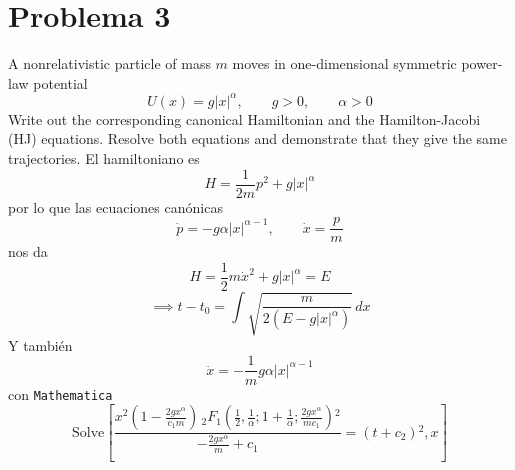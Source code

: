 \documentclass[]{article}
\numberwithin{equation}{section}
\begin{document}
\section{Problema 3}
A nonrelativistic particle of mass $m$ moves in one-dimensional symmetric power-law potential
\begin{equation}
	U(x) = g |x|^\alpha, \qquad g>0, \qquad \alpha>0 
\end{equation}
Write out the corresponding canonical Hamiltonian and the Hamilton-Jacobi (HJ) equations. Resolve both equations and demonstrate that they give the same trajectories.
\resp El hamiltoniano es
\begin{equation}
	H = \frac{1}{2 m} p^2 + g |x|^\alpha
\end{equation}
por lo que las ecuaciones canónicas
\begin{equation}
	\dot{p} = - g \alpha |x|^{\alpha-1}, \qquad \dot{x} = \frac{p}{m}
\end{equation}
nos da
\begin{equation}
	H = \frac{1}{2} m \dot{x}^2 + g |x|^\alpha = E
\end{equation}
\begin{equation}
	\implies t - t_0 = \int \sqrt{\frac{m}{2 (E - g |x|^\alpha)}} \, dx	
\end{equation}
Y también
\begin{equation}
	\ddot{x} = -\frac{1}{m} g \alpha |x|^{\alpha-1}
\end{equation}
con \texttt{Mathematica}
\begin{equation}
	\text{Solve}\left[\frac{x^2 \left(1-\frac{2 g x^{\alpha }}{c_1 m}\right) \, _2F_1\left(\frac{1}{2},\frac{1}{\alpha };1+\frac{1}{\alpha };\frac{2 g x^{\alpha }}{m c_1}\right){}^2}{-\frac{2 g x^{\alpha }}{m}+c_1}=(t+c_2){}^2,x\right]
\end{equation}
\end{document}
